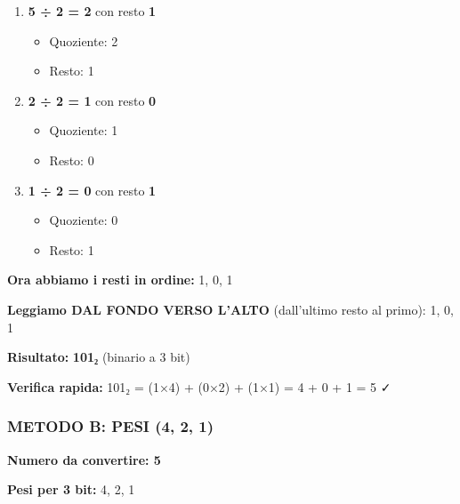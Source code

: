 \documentclass[
]{article}
\providecommand{\tightlist}{%
  \setlength{\itemsep}{0pt}\setlength{\parskip}{0pt}}
\begin{document}
\begin{enumerate}
\def\labelenumi{\arabic{enumi}.}
\tightlist
\item
  \textbf{5 ÷ 2 = 2} con resto \textbf{1}

  \begin{itemize}
  \tightlist
  \item
    Quoziente: 2
  \item
    Resto: 1
  \end{itemize}
\item
  \textbf{2 ÷ 2 = 1} con resto \textbf{0}

  \begin{itemize}
  \tightlist
  \item
    Quoziente: 1
  \item
    Resto: 0
  \end{itemize}
\item
  \textbf{1 ÷ 2 = 0} con resto \textbf{1}

  \begin{itemize}
  \tightlist
  \item
    Quoziente: 0
  \item
    Resto: 1
  \end{itemize}
\end{enumerate}

\textbf{Ora abbiamo i resti in ordine:} 1, 0, 1

\textbf{Leggiamo DAL FONDO VERSO L'ALTO} (dall'ultimo resto al primo): 1, 0, 1

\textbf{Risultato:} \textbf{101₂} (binario a 3 bit)

\textbf{Verifica rapida:} 101₂ = (1×4) + (0×2) + (1×1) = 4 + 0 + 1 = 5 ✓

\hypertarget{metodo-b-pesi-4-2-1}{%
\subsubsection{\texorpdfstring{\textbf{METODO B: PESI (4, 2, 1)}}{METODO B: PESI (4, 2, 1)}}\label{metodo-b-pesi-4-2-1}}

\textbf{Numero da convertire: 5}

\textbf{Pesi per 3 bit:} 4, 2, 1
\end{document}
